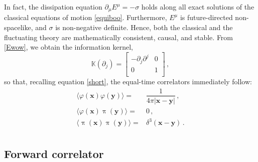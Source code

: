 \documentclass[a4paper, amsfonts, amssymb, amsmath, reprint, showkeys, nofootinbib, twoside,notitlepage,onecolumn]{revtex4-2}
\newcommand{\Ka}{{\mathbb{K}}}
\newcommand{\x}{{\textbf{x}}}
\newcommand{\y}{{\textbf{y}}}
\theoremstyle{definition}
\begin{document}
In fact, the dissipation equation $\partial_\mu E^\mu = -\sigma$ holds along all exact solutions of the classical equations of motion \eqref{equiboo}. Furthermore, $E^\mu$ is future-directed non-spacelike, and $\sigma$ is non-negative definite. Hence, both the classical and the fluctuating theory are mathematically consistent, causal, and stable. From \eqref{Ewow}, we obtain the information kernel,
\begin{equation}
    \Ka(\partial_j)= \begin{bmatrix}
        -\partial_j \partial^j & 0 \\
        0 & 1 \\
    \end{bmatrix} \, ,
\end{equation}
so that, recalling equation \eqref{short}, the equal-time correlators immediately follow:
\begin{equation}
    \begin{split}
 \langle \varphi(\x)\varphi(\y)\rangle ={}& \dfrac{1}{4\pi |\x -\y|}  \, , \\
 \langle \varphi(\x)\uppi(\y)\rangle ={}&  0 \, , \\
 \langle \uppi(\x)\uppi(\y)\rangle ={}& \delta^3(\x-\y)  \, . \\
    \end{split}
\end{equation}


\subsection{Forward correlator}
\end{document}
